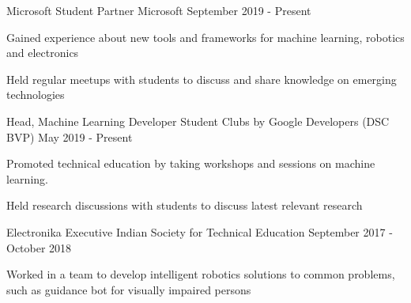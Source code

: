 

\begin{cventries}
  \cventry
    {Microsoft Student Partner} %
    {Microsoft} %
    {} %
    {September 2019 - Present} %
    {
      \begin{cvitems} %
        \item {Gained experience about new tools and frameworks for machine learning, robotics and electronics}
        \item {Held regular meetups with students to discuss and share knowledge on emerging technologies}
      \end{cvitems}
    }

  \cventry
    {Head, Machine Learning} %
    {Developer Student Clubs by Google Developers (DSC BVP)} %
    {} %
    {May 2019 - Present} %
    {
      \begin{cvitems} %
        \item {Promoted technical education by taking workshops and sessions on machine learning.}
        \item {Held research discussions with students to discuss latest relevant research}
      \end{cvitems}
    }
    
\cventry
    {Electronika Executive} %
    {Indian Society for Technical Education} %
    {} %
    {September 2017 - October 2018} %
   {
     \begin{cvitems} %
     \item {Worked in a team to develop intelligent robotics solutions to common problems, such as guidance bot for visually impaired persons}
     \end{cvitems}
   }

\end{cventries}
